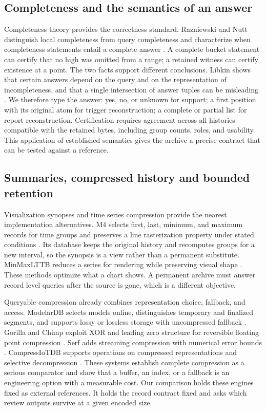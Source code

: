 \documentclass[a4paper,fleqn]{cas-dc}
\begin{document}
\subsection{Completeness and the semantics of an answer}

Completeness theory provides the correctness standard. Razniewski and Nutt distinguish local completeness from query completeness and characterize when completeness statements entail a complete answer \cite{RazniewskiNutt2011}. A complete bucket statement can certify that no high was omitted from a range; a retained witness can certify existence at a point. The two facts support different conclusions. Libkin shows that certain answers depend on the query and on the representation of incompleteness, and that a single intersection of answer tuples can be misleading \cite{Libkin2015}. We therefore type the answer: yes, no, or unknown for support; a first position with its original atom for trigger reconstruction; a complete or partial list for report reconstruction. Certification requires agreement across all histories compatible with the retained bytes, including group counts, roles, and usability. This application of established semantics gives the archive a precise contract that can be tested against a reference.

\subsection{Summaries, compressed history and bounded retention}

Visualization synopses and time series compression provide the nearest implementation alternatives. M4 selects first, last, minimum, and maximum records for time groups and preserves a line rasterization property under stated conditions \cite{Jugel2014M4}. Its database keeps the original history and recomputes groups for a new interval, so the synopsis is a view rather than a permanent substitute. MinMaxLTTB reduces a series for rendering while preserving visual shape \cite{VanDerDonckt2023}. These methods optimize what a chart shows. A permanent archive must answer record level queries after the source is gone, which is a different objective.

Queryable compression already combines representation choice, fallback, and access. ModelarDB selects models online, distinguishes temporary and finalized segments, and supports lossy or lossless storage with uncompressed fallback \cite{Jensen2018ModelarDB}. Gorilla and Chimp exploit XOR and leading zero structure for reversible floating point compression \cite{Pelkonen2015Gorilla,Liakos2022Chimp}. Serf adds streaming compression with numerical error bounds \cite{Li2025Serf}. CompressIoTDB supports operations on compressed representations and selective decompression \cite{Tang2025IoTDB}. These systems establish complete compression as a serious comparator and show that a buffer, an index, or a fallback is an engineering option with a measurable cost. Our comparison holds these engines fixed as external references. It holds the record contract fixed and asks which review outputs survive at a given encoded size.
\end{document}
